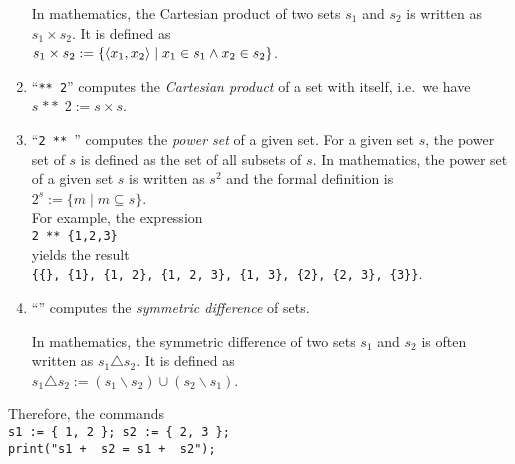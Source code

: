 \begin{enumerate}
      In mathematics, the Cartesian product of two sets $s_1$ and $s_2$ is written
      as $s_1 \times s_2$.  It is defined as
      \\[0.2cm]
      \hspace*{1.3cm}
      $s_1 \times s_2 := \{ \pair(x_1,x_2) \mid x_1 \in s_1 \wedge x_2 \in s_2 \}$.
\item ``\texttt{** 2}'' computes the \emph{Cartesian product} of a set with itself,
      i.e.~we have 
      \\[0.2cm]
      \hspace*{1.3cm}
      $s \;\mathtt{**}\; 2 := s \times s$.
\item ``\texttt{2 ** }'' computes the \emph{power set} of a given set.  For a given set
      $s$, the power set of $s$ is defined as the set of all subsets of $s$.
      In mathematics, the power set of a given set $s$ is written as $s^2$ and the formal
      definition is
      \\[0.2cm]
      \hspace*{1.3cm}
      $2^s := \{ m \mid m \subseteq s \}$.
      \\[0.2cm]
      For example, the expression
      \\[0.2cm]
      \hspace*{1.3cm}
      \texttt{2 ** \{1,2,3\}}
      \\[0.2cm]
      yields the result
      \\[0.2cm]
      \hspace*{1.3cm}
      \texttt{\{\{\}, \{1\}, \{1, 2\}, \{1, 2, 3\}, \{1, 3\}, \{2\}, \{2, 3\}, \{3\}\}}.
\item ``\texttt{}'' computes the \emph{symmetric difference} of sets.

      In mathematics, the symmetric difference of two sets $s_1$ and $s_2$ is often written
      as $s_1 \triangle s_2$.  It is defined as
      \\[0.2cm]
      \hspace*{1.3cm}
      $s_1 \triangle s_2 := (s_1 \backslash s_2) \cup (s_2 \backslash s_1)$.
\end{enumerate}
Therefore, the commands
\\[0.2cm]
\hspace*{1.3cm}
\texttt{s1 := \{ 1, 2 \}; s2 := \{ 2, 3 \};}
\\
\hspace*{1.3cm}
\texttt{print("s1 + \ s2 = s1 + \ s2");}
\\
\hspace*{1.3cm}
